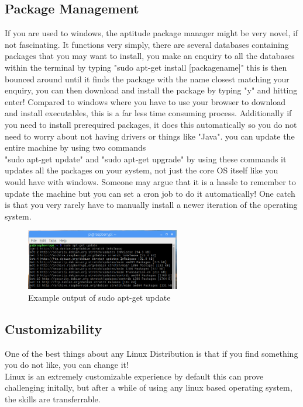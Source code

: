 \documentclass{article}
\begin{document}
	\subsection{Package Management}
	If you are used to windows, the aptitude package manager might be very novel, if not fascinating. It functions very simply, there are several databases containing packages that you may want to install, you make an enquiry to all the databases within the terminal by typing "sudo apt-get install [packagename]" this is then bounced around until it finds the package with the name closest matching your enquiry, you can then download and install the package by typing "y" and hitting enter! Compared to windows where you have to use your browser to download and install executables, this is a far less time consuming process. Additionally if you need to install prerequired packages, it does this automatically so you do not need to worry about not having drivers or things like "Java". you can update the entire machine by using two commands\\ "sudo apt-get update" and "sudo apt-get upgrade" by using these commands it updates all the packages on your system, not just the core OS itself like you would have with windows. Someone may argue that it is a hassle to remember to update the machine but you can set a cron job to do it automatically! One catch is that you very rarely have to manually install a newer iteration of the operating system.
	\begin{figure}[h!]
		\centering
		\includegraphics[width=0.6\textwidth]{updatesudorpi.png}
		\caption{Example output of sudo apt-get update}
	\end{figure}
	\newpage
	\subsection{Customizability}
	One of the best things about any Linux Distribution is that if you find something you do not like, you can change it!\\Linux is an extremely customizable experience by default this can prove challenging initally, but after a while of using any linux based operating system, the skills are transferrable.
\end{document}
